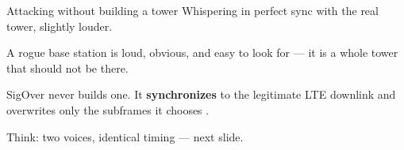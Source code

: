 \begin{frame}{Attacking without building a tower}
  \vspace{0.5em}
    {Whispering in perfect sync with the real tower, slightly louder.}

  \vspace{0.7em}
  \normalsize
  A rogue base station is loud, obvious, and easy to look for --- it is a
  whole tower that should not be there.

  \vspace{0.6em}
  SigOver never builds one. It \textbf{synchronizes} to the legitimate LTE
  downlink and overwrites only the subframes it chooses
  .

  \vspace{0.5em}
  {\small\textcolor{softgray}{Think: two voices, identical timing --- next
   slide.}\par}

  \vspace{0.5em}

\end{frame}

